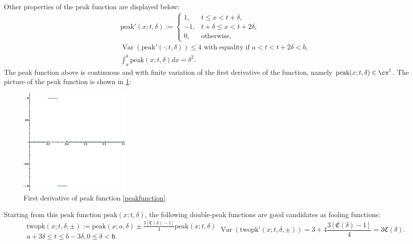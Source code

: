 \documentclass{iitthesis}
\DeclareMathOperator{\Var}{Var}
\theoremstyle{definition}
\theoremstyle{remark}
\begin{document}
Other properties of the peak function are displayed below:
\begin{gather*}
  \text{peak}'(x;t,\delta):= \begin{cases} \displaystyle 1, & t \le x < t+\delta,\\[1ex]
\displaystyle -1, & t+\delta \le x < t+2\delta,\\[1ex]
\displaystyle  0, & \text{otherwise},
\end{cases} \\
\Var(\text{peak}'(\cdot;t,\delta))\le 4 \text{ with equality if } a<t<t+2\delta<b, \\
\int_{a}^{b}\text{peak}(x;t,\delta)dx=\delta^2.
\end{gather*}
The peak function above is continuous and with finite variation of the first derivative of the function, namely $\text{peak}(x;t,\delta)\in\cv^1$. The picture of the peak function is shown in \ref{fig:peakp1}:
\begin{figure}[ht]
\centering
\includegraphics[width=5.5cm]{peakp1.eps}
\caption{First derivative of peak function \ref{peakfunction}. \label{fig:peakp1}}
\end{figure}
Starting from this peak function $\text{peak}(x;t,\delta)$, the following double-peak functions are good candidates as fooling functions:
\begin{subequations}
    \begin{multline}\label{foolingfunctiontrap}
        \text{twopk}(x;t,\delta,\pm):=\text{peak}(x;a,\mathfrak{\delta})\pm\frac{3[\mathfrak{C}(\delta)-1]}{4}\text{peak}(x;t,\delta)\\ a+3\mathfrak{\delta}\le t \le b-3\delta, 0\le \delta <\mathfrak{h}.
    \end{multline}
    \begin{equation}
        \Var(\text{twopk}'(x;t,\delta,\pm))=3+4\frac{3[\mathfrak{C}(\delta)-1]}{4}=3\mathfrak{C}(\delta).
    \end{equation}
\end{subequations}
\end{document}
